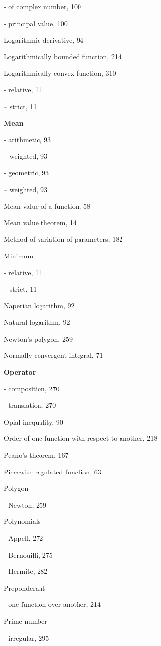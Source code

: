 - of complex number, 100

- principal value, 100

Logarithmic derivative, 94

Logarithmically bounded function, 214

Logarithmically convex function, 310

- relative, 11

-- strict, 11

\par\noindent\textbf{Mean}\par

- arithmetic, 93

-- weighted, 93

- geometric, 93

-- weighted, 93

Mean value of a function, 58

Mean value theorem, 14

Method of variation of parameters, 182

Minimum

- relative, 11

-- strict, 11

Naperian logarithm, 92

Natural logarithm, 92

Newton's polygon, 259

Normally convergent integral, 71

\par\noindent\textbf{Operator}\par

- composition, 270

- translation, 270

Opial inequality, 90

Order of one function with respect to another, 218

Peano's theorem, 167

Piecewise regulated function, 63

Polygon

- Newton, 259

Polynomials

- Appell, 272

- Bernouilli, 275

- Hermite, 282

Preponderant

- one function over another, 214

Prime number

- irregular, 295


